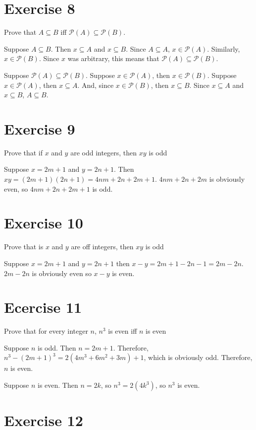 \documentclass[11pt]{article}
\newcommand{\powerset}[1]{\mathscr{P}(#1)}
\begin{document}
\section*{Exercise 8}

Prove that $A \subseteq B$ iff $\powerset{A} \subseteq \powerset{B}$.

Suppose $A \subseteq B$. Then $x \subseteq A$ and $x \subseteq B$. Since 
$A \subseteq A$, $x \in \powerset{A}$. Similarly, $x \in \powerset{B}$. Since 
$x$ was arbitrary, this means that $\powerset{A} \subseteq \powerset{B}$.

Suppose $\powerset{A} \subseteq \powerset{B}$. Suppose $x \in \powerset{A}$,
then $x \in \powerset{B}$. Suppose $x \in \powerset{A}$, then $x \subseteq A$.
And, since $x \in \powerset{B}$, then $x \subseteq B$. Since $x \subseteq A$
and $x \subseteq B$, $A \subseteq B$.

\section*{Exercise 9}

Prove that if $x$ and $y$ are odd integers, then $xy$ is odd 

Suppose $x = 2m + 1$ and $y = 2n + 1$. Then 
$xy = (2m + 1)(2n + 1)  = 4nm + 2n + 2m + 1$. $4nm + 2n + 2m$ is obviously 
even, so $4nm + 2n + 2m + 1$ is odd. 

\section*{Exercise 10}

Prove that is $x$ and $y$ are off integers, then $xy$ is odd

Suppose $x = 2m + 1$ and $y = 2n + 1$ then 
$x - y = 2m + 1 - 2n - 1 = 2m - 2n$. $2m - 2n$ is obviously even so $x - y$ is 
even.

\section*{Ecercise 11}

Prove that for every integer $n$, $n^3$ is even iff $n$ is even

Suppose $n$ is odd. Then $n = 2m + 1$. Therefore, 
$n^3 - (2m + 1)^3 = 2(4m^3 + 6m^2 + 3m) + 1$, which is obviously odd. Therefore,
$n$ is even.

Suppose $n$ is even. Then $n = 2k$, so $n^3 = 2(4k^3)$, so $n^3$ is even. 

\section*{Exercise 12}
\end{document}

